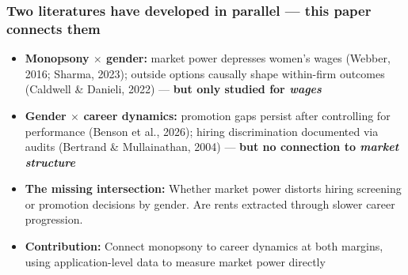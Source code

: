 \documentclass[aspectratio=169, 11pt]{beamer}
\newcommand{\bmark}[1]{\textcolor{midblue}{\textbf{#1}}}
\begin{document}
\begin{frame}
\frametitle{Two literatures have developed in parallel --- this paper connects them}

\begin{itemize}
    \item \textbf{Monopsony $\times$ gender:} market power depresses women's wages (Webber, 2016; Sharma, 2023); outside options causally shape within-firm outcomes (Caldwell \& Danieli, 2022) --- \small \bmark{but only studied for \emph{wages}}
    \normalsize
    \medskip
    \item \textbf{Gender $\times$ career dynamics:} promotion gaps persist after controlling for performance (Benson et al., 2026); hiring discrimination documented via audits (Bertrand \& Mullainathan, 2004) --- \small \bmark{but no connection to \emph{market structure}}
    \normalsize
    \medskip
    \item \textbf{The missing intersection:} Whether market power distorts hiring screening or promotion decisions by gender. %
    Are rents extracted through slower career progression.

    \medskip
    \item \textbf{Contribution:} Connect monopsony to career dynamics at both margins, using application-level data to measure market power directly
\end{itemize}

\end{frame}

\end{document}
